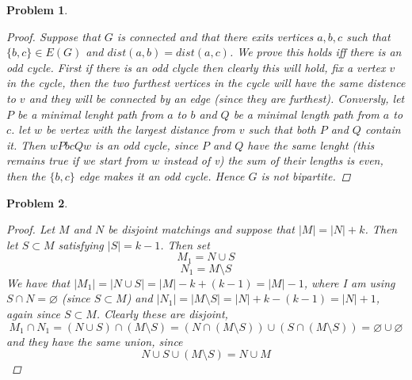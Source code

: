 \documentclass{article}
\newtheorem{prb}{Problem}
\begin{document}
\begin{prb} 
	\begin{proof} 
		Suppose that $G$ is connected and that there exits vertices $a, b, c$ such that $\{b, c \} \in E(G)$ and 
		$dist(a, b) = dist(a, c)$. We prove this holds iff there is an odd cycle. First if there is an odd clycle then clearly this will hold, fix a vertex $v$ in the cycle, then the two furthest vertices in the cycle will have the same distence to $v$ and they will be connected by an edge (since they are furthest). Conversly, let $P$ be a minimal lenght path from $a$ to $b$ and $Q$ be a minimal length path from $a$ to $c$. let $w$ be vertex 
with the largest distance from $v$ such that both $P$ and $Q$ contain it. Then $wPbcQw$ is an odd cycle, since $P$ and $Q$ have the same lenght 
(this remains true if we start from $w$ instead of v) the sum of their lengths is even, then the $\{b, c\}$ edge makes it an odd cycle. Hence $G$ is not bipartite. 
	\end{proof}
\end{prb}
\newpage
\begin{prb} 

	\begin{proof} 
		Let $M$ and $N$ be disjoint matchings and suppose that $|M| = |N| + k$. 
		Then let $S \subset M$ satisfying $|S| = k-1$. Then set 
		\[ M_1 = N \cup S \] 
		\[ N_1 = M \setminus S \] 
		We have that $|M_1| = |N \cup S| = |M| - k + (k - 1) = |M| - 1$, where I am using $S \cap N = \varnothing$ (since $S \subset M$) 
		and $|N_1| = |M \setminus S| = |N| + k - (k - 1) = |N| + 1$, again since $S \subset M$. Clearly these are disjoint, 
		\[M_1 \cap N_1 = (N \cup S) \cap (M \setminus S) = (N \cap (M \setminus S)) \cup (S \cap (M \setminus S)) = \varnothing \cup \varnothing\] 
		and they have the same union, since 
		\[N \cup S \cup (M \setminus S) = N \cup M \] 

	\end{proof}
\end{prb}
 
\end{document}

